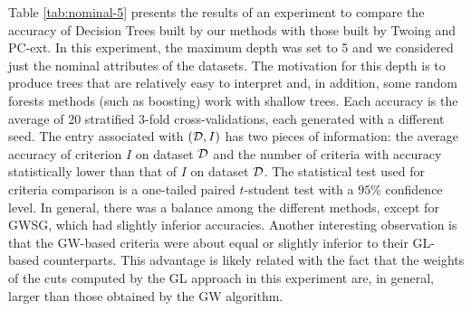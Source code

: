 Table \ref{tab:nominal-5} presents  the results of an experiment to
compare the accuracy of  Decision Trees built by  our methods with those built by Twoing and PC-ext.
In this experiment, the maximum depth was set to 5 and we considered just the nominal attributes of the datasets. 
The motivation for this depth is to produce trees that
are relatively easy to interpret and, in addition, some random
forests methods (such as boosting) work with shallow trees.
Each accuracy is the average of 20 stratified 3-fold cross-validations,
each generated with a different seed.
The entry  associated with  $({\cal D},I)$ has two pieces of information: the average accuracy
of criterion $I$ on dataset ${\cal D}$ and the number of criteria
with accuracy   statistically lower than that of $I$ on dataset ${\cal D}$. 
The statistical test used for criteria comparison is a  one-tailed paired $t$-student test with a $95\% $ confidence level. 
In general, there was a balance among the different methods,
except for GWSG, which had slightly inferior accuracies. Another interesting observation is that the GW-based criteria were
about equal or slightly inferior to their GL-based counterparts. This advantage is likely related with the fact that the weights of
the cuts computed by the GL approach in this experiment are, in general, larger than those obtained by the GW algorithm.


